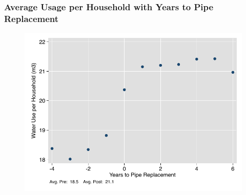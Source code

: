\documentclass[aspectratio=32]{beamer}
\begin{document}
\begin{frame}
\frametitle{Average Usage per Household with Years to Pipe Replacement}
\begin{figure}
\begin{center}
\includegraphics[scale=.73]{tables/pipe_cons.pdf}
\end{center}
\end{figure}
\end{frame}








\end{document}

